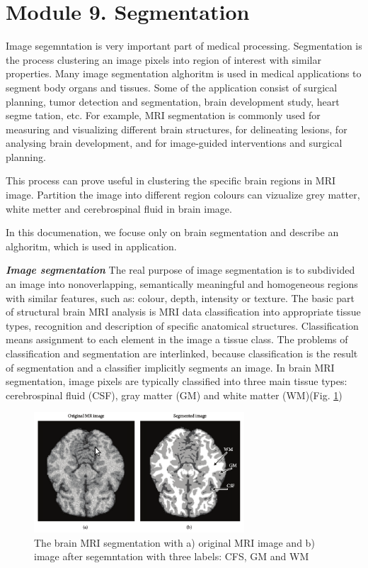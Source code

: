 \section{Module 9. Segmentation}

Image segemntation is very important part of medical processing. Segmentation is the process clustering an image pixels into region of interest with similar properties. Many image segmentation alghoritm is used in medical applications to segment body organs and tissues. Some of the application  consist of surgical planning, tumor detection and segmentation, brain development study, heart segme tation, etc. For example, MRI segmentation is commonly used for measuring and visualizing different brain structures, for delineating lesions, for analysing brain development, and for image-guided interventions and surgical planning.  

This process can prove useful in clustering the specific brain regions in MRI image. Partition the image into different region colours can vizualize grey matter, white metter and cerebrospinal fluid in brain image. 

In this documenation, we focuse only on brain segmentation and describe an alghoritm, which is used in application.

\textbf{\textit{Image segmentation}}
The real purpose of image segmentation is to subdivided an image into nonoverlapping, semantically meaningful and homogeneous regions with similar features, such as: colour, depth, intensity or texture. The basic part of structural brain MRI analysis  is MRI data classification into appropriate tissue types, recognition and description of specific anatomical structures.
Classification means assignment to each element in the image a tissue class. The problems of classification and segmentation are interlinked, because classification is the result of segmentation and  a classifier implicitly segments an image. In brain MRI segmentation, image pixels are typically classified into three main tissue types:  cerebrospinal fluid (CSF), gray matter (GM)  and white matter (WM)(Fig. \ref{fig:figures/m09_1}) 

\begin{figure}[H]
\centering{}\includegraphics[width=0.7\textwidth]{figures/Module_09/m09_1} \caption{The brain MRI segmentation with a) original MRI image and b) image after segemntation with three labels: CFS, GM and WM  \label{fig:figures/m09_1}}
\end{figure}

